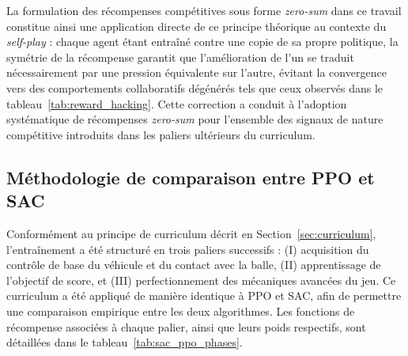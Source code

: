 La formulation des récompenses compétitives sous forme \textit{zero-sum} dans ce travail constitue ainsi une application directe de ce principe théorique au contexte du \textit{self-play} : chaque agent étant entraîné contre une copie de sa propre politique, la symétrie de la récompense garantit que l'amélioration de l'un se traduit nécessairement par une pression équivalente sur l'autre, évitant la convergence vers des comportements collaboratifs dégénérés tels que ceux observés dans le tableau~\ref{tab:reward_hacking}. Cette correction a conduit à l'adoption systématique de récompenses \textit{zero-sum} pour l'ensemble des signaux de nature compétitive introduits dans les paliers ultérieurs du curriculum.

\subsection{Méthodologie de comparaison entre PPO et SAC}
\label{sec:sac_comparison}

Conformément au principe de curriculum décrit en Section~\ref{sec:curriculum}, l'entraînement a été structuré en trois paliers successifs : (I) acquisition du contrôle de base du véhicule et du contact avec la balle, (II) apprentissage de l'objectif de score, et (III) perfectionnement des mécaniques avancées du jeu. Ce curriculum a été appliqué de manière identique à PPO et SAC, afin de permettre une comparaison empirique entre les deux algorithmes. Les fonctions de récompense associées à chaque palier, ainsi que leurs poids respectifs, sont détaillées dans le tableau~\ref{tab:sac_ppo_phases}.

